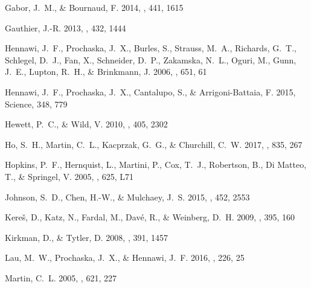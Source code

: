 \documentclass[iop]{emulateapj}
\begin{document}
\begin{thebibliography}{45}
{Gabor}, J.~M., \& {Bournaud}, F. 2014, \mnras, 441, 1615

{Gauthier}, J.-R. 2013, \mnras, 432, 1444

{Hennawi}, J.~F., {Prochaska}, J.~X., {Burles}, S., {Strauss}, M.~A.,
  {Richards}, G.~T., {Schlegel}, D.~J., {Fan}, X., {Schneider}, D.~P.,
  {Zakamska}, N.~L., {Oguri}, M., {Gunn}, J.~E., {Lupton}, R.~H., \&
  {Brinkmann}, J. 2006, \apj, 651, 61

{Hennawi}, J.~F., {Prochaska}, J.~X., {Cantalupo}, S., \& {Arrigoni-Battaia},
  F. 2015, Science, 348, 779

{Hewett}, P.~C., \& {Wild}, V. 2010, \mnras, 405, 2302

{Ho}, S.~H., {Martin}, C.~L., {Kacprzak}, G.~G., \& {Churchill}, C.~W. 2017,
  \apj, 835, 267

{Hopkins}, P.~F., {Hernquist}, L., {Martini}, P., {Cox}, T.~J., {Robertson},
  B., {Di Matteo}, T., \& {Springel}, V. 2005, \apjl, 625, L71

{Johnson}, S.~D., {Chen}, H.-W., \& {Mulchaey}, J.~S. 2015, \mnras, 452, 2553

{Kere\v{s}}, D., {Katz}, N., {Fardal}, M., {Dav{\'e}}, R., \& {Weinberg}, D.~H.
  2009, \mnras, 395, 160

{Kirkman}, D., \& {Tytler}, D. 2008, \mnras, 391, 1457

{Lau}, M.~W., {Prochaska}, J.~X., \& {Hennawi}, J.~F. 2016, \apjs, 226, 25

{Martin}, C.~L. 2005, \apj, 621, 227


\end{thebibliography}
\end{document}
